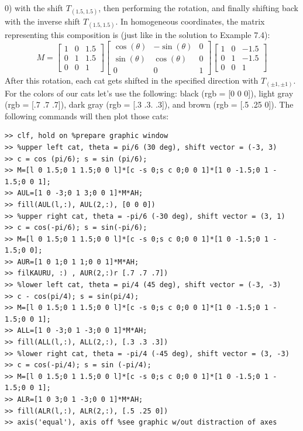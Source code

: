\documentclass[../main.tex]{subfiles}
\begin{document}
0) with the shift $T_{(1.5,1.5)}$, then performing the rotation, and finally shifting back with the inverse shift $T_{(1.5,1.5)}$. In homogeneous coordinates, the matrix representing this composition is (just like in the 
solution to Example 7.4): 
$$
M=\left[\begin{array}{ccc}
1 & 0 & 1.5 \\
0 & 1 & 1.5 \\
0 & 0 & 1
\end{array}\right]\left[\begin{array}{ccc}
\cos (\theta) & -\sin (\theta) & 0 \\
\sin (\theta) & \cos (\theta) & 0 \\
0 & 0 & 1
\end{array}\right]\left[\begin{array}{ccc}
1 & 0 & -1.5 \\
0 & 1 & -1.5 \\
0 & 0 & 1
\end{array}\right]
$$
After this rotation, each cat gets shifted in the specified direction with $T_{(\pm1,\pm1)}$. For the colors of our 
cats let's use the following: black (rgb = [0 0 0]), light gray (rgb = [.7 .7 .7]), dark gray (rgb = [.3 .3. 
.3]), and brown (rgb = [.5 .25 0]). The following commands will then plot those cats: 
\begin{lstlisting}[numbers=none,frame=none]
>> clf, hold on %prepare graphic window 
>> %upper left cat, theta = pi/6 (30 deg), shift vector = (-3, 3) 
>> c = cos (pi/6); s = sin (pi/6); 
>> M=[l 0 1.5;0 1 1.5;0 0 l]*[c -s 0;s c 0;0 0 1]*[1 0 -1.5;0 1 -
1.5;0 0 1]; 
>> AUL=[1 0 -3;0 1 3;0 0 1]*M*AH; 
>> fill(AUL(l,:), AUL(2,:), [0 0 0]) 
>> %upper right cat, theta = -pi/6 (-30 deg), shift vector = (3, 1) 
>> c = cos(-pi/6); s = sin(-pi/6); 
>> M=[l 0 1.5;0 1 1.5;0 0 l]*[c -s 0;s c 0;0 0 1]*[1 0 -1.5;0 1 -
1.5;0 0]; 
>> AUR=[1 0 1;0 1 1;0 0 1]*M*AH; 
>> filKAURU, :) , AUR(2,:)r [.7 .7 .7]) 
>> %lower left cat, theta = pi/4 (45 deg), shift vector = (-3, -3) 
>> c - cos(pi/4); s = sin(pi/4); 
>> M=[l 0 1.5;0 1 1.5;0 0 l]*[c -s 0;s c 0;0 0 1]*[1 0 -1.5;0 1 -
1.5;0 0 1]; 
>> ALL=[1 0 -3;0 1 -3;0 0 1]*M*AH; 
>> fill(ALL(l,:), ALL(2,:), [.3 .3 .3]) 
>> %lower right cat, theta = -pi/4 (-45 deg), shift vector = (3, -3) 
>> c = cos(-pi/4); s = sin (-pi/4); 
>> M=[l 0 1.5;0 1 1.5;0 0 l]*[c -s 0;s c 0;0 0 1]*[1 0 -1.5;0 1 -
1.5;0 0 1]; 
>> ALR=[1 0 3;0 1 -3;0 0 1]*M*AH; 
>> fill(ALR(l,:), ALR(2,:), [.5 .25 0]) 
>> axis('equal'), axis off %see graphic w/out distraction of axes
\end{lstlisting}
\end{document}
